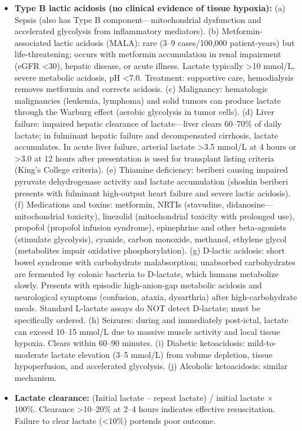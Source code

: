 \begin{itemize}
  \item \textbf{Type B lactic acidosis (no clinical evidence of tissue hypoxia):} (a) Sepsis (also has Type B component---mitochondrial dysfunction and accelerated glycolysis from inflammatory mediators). (b) Metformin-associated lactic acidosis (MALA): rare (3--9 cases/100,000 patient-years) but life-threatening; occurs with metformin accumulation in renal impairment (eGFR <30), hepatic disease, or acute illness. Lactate typically >10 mmol/L, severe metabolic acidosis, pH <7.0. Treatment: supportive care, hemodialysis removes metformin and corrects acidosis. (c) Malignancy: hematologic malignancies (leukemia, lymphoma) and solid tumors can produce lactate through the Warburg effect (aerobic glycolysis in tumor cells). (d) Liver failure: impaired hepatic clearance of lactate---liver clears 60--70\% of daily lactate; in fulminant hepatic failure and decompensated cirrhosis, lactate accumulates. In acute liver failure, arterial lactate >3.5 mmol/L at 4 hours or >3.0 at 12 hours after presentation is used for transplant listing criteria (King's College criteria). (e) Thiamine deficiency: beriberi causing impaired pyruvate dehydrogenase activity and lactate accumulation (shoshin beriberi presents with fulminant high-output heart failure and severe lactic acidosis). (f) Medications and toxins: metformin, NRTIs (stavudine, didanosine---mitochondrial toxicity), linezolid (mitochondrial toxicity with prolonged use), propofol (propofol infusion syndrome), epinephrine and other beta-agonists (stimulate glycolysis), cyanide, carbon monoxide, methanol, ethylene glycol (metabolites impair oxidative phosphorylation). (g) D-lactic acidosis: short bowel syndrome with carbohydrate malabsorption; unabsorbed carbohydrates are fermented by colonic bacteria to D-lactate, which humans metabolize slowly. Presents with episodic high-anion-gap metabolic acidosis and neurological symptoms (confusion, ataxia, dysarthria) after high-carbohydrate meals. Standard L-lactate assays do NOT detect D-lactate; must be specifically ordered. (h) Seizures: during and immediately post-ictal, lactate can exceed 10--15 mmol/L due to massive muscle activity and local tissue hypoxia. Clears within 60--90 minutes. (i) Diabetic ketoacidosis: mild-to-moderate lactate elevation (3--5 mmol/L) from volume depletion, tissue hypoperfusion, and accelerated glycolysis. (j) Alcoholic ketoacidosis: similar mechanism.
  \item \textbf{Lactate clearance:} (Initial lactate -- repeat lactate) / initial lactate $\times$ 100\%. Clearance >10--20\% at 2--4 hours indicates effective resuscitation. Failure to clear lactate (<10\%) portends poor outcome.
\end{itemize}

